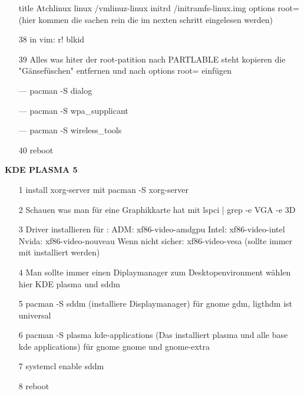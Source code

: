 \documentclass[a4paper,12pt]{article}
\begin{document}
\begin{itemize}
		\subitem title Atchlinux
		\subitem linux /vmlinuz-linux
		\subitem initrd /initramfs-linux.img
		\subitem options root=(hier kommen die sachen rein die im nexten schritt eingelesen werden)
	\item[38] in vim:    r! blkid
	\item[39] Alles was hiter der root-patition nach PARTLABLE steht kopieren die "Gänsefüschen" entfernen und nach options root=   einfügen
	\item[---] pacman -S dialog
	\item[---] pacman -S wpa\_supplicant
	\item[---] pacman -S wireless\_tools
	\item[40] reboot 
\end{itemize}
	
	\clearpage
	\begin{LARGE}
		\begin{center}
			\textbf{KDE PLASMA 5}
		\end{center}
	\end{LARGE}		
	
	\clearpage
	
	\begin{itemize}
		\item[1] install xorg-server mit pacman -S xorg-server
		\item[2] Schauen was man für eine Graphikkarte hat mit lspci | grep -e VGA -e 3D
		\item[3] Driver installieren für :
			\subitem ADM: xf86-video-amdgpu
			\subitem Intel: xf86-video-intel
			\subitem Nvida: xf86-video-nouveau
			\subitem Wenn nicht sicher: xf86-video-vesa (sollte immer mit installiert werden)
		\item[4] Man sollte immer einen Diplaymanager zum Desktopenvironment wählen hier KDE plasma und sddm
		\item[5] pacman -S sddm (installiere Displaymanager) für gnome gdm, ligthdm ist universal
		\item[6] pacman -S plasma kde-applications (Das installiert plasma und alle base kde applications) für gnome gnome und gnome-extra
		\item[7] systemcl enable sddm
		\item[8] reboot
		
	\end{itemize}
	
	
	
\end{document}
